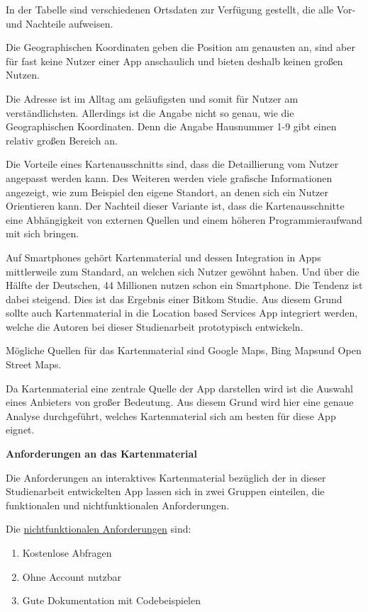 In der Tabelle sind verschiedenen Ortsdaten zur Verfügung gestellt, die alle Vor- und Nachteile aufweisen.

Die Geographischen Koordinaten geben die Position am genausten an, sind aber für fast keine Nutzer einer App anschaulich und bieten deshalb keinen großen Nutzen. 

Die Adresse ist im Alltag am geläufigsten und somit für Nutzer am verständlichsten. Allerdings ist die Angabe nicht so genau, wie die Geographischen Koordinaten. Denn die Angabe Hausnummer 1-9 gibt einen relativ großen Bereich an.

Die Vorteile eines Kartenausschnitts sind, dass die Detaillierung vom Nutzer angepasst werden kann. Des Weiteren werden viele grafische Informationen angezeigt, wie zum Beispiel den eigene Standort, an denen sich ein Nutzer Orientieren kann. Der Nachteil dieser Variante ist, dass die Kartenausschnitte eine Abhängigkeit von externen Quellen und einem höheren Programmieraufwand mit sich bringen.


Auf Smartphones gehört Kartenmaterial und dessen Integration in Apps mittlerweile zum Standard, an welchen sich Nutzer gewöhnt haben. Und über die Hälfte der Deutschen, 44 Millionen nutzen schon ein Smartphone. Die Tendenz ist dabei steigend. Dies ist das Ergebnis einer Bitkom Studie. \cite{bitkom} Aus diesem Grund sollte auch Kartenmaterial in die Location based Services App integriert werden, welche die Autoren bei dieser Studienarbeit prototypisch entwickeln. 

Mögliche Quellen für das Kartenmaterial sind \glqq Google Maps\grqq, \glqq Bing Maps\grqq  und \glqq Open Street Maps\grqq.

Da Kartenmaterial eine zentrale Quelle der App darstellen wird ist die Auswahl eines Anbieters von großer Bedeutung. Aus diesem Grund wird hier eine genaue Analyse durchgeführt, welches Kartenmaterial sich am besten für diese App eignet.

\textbf{Anforderungen an das Kartenmaterial}

Die Anforderungen an interaktives Kartenmaterial bezüglich der in dieser Studienarbeit entwickelten App lassen sich in zwei Gruppen einteilen, die funktionalen und nichtfunktionalen Anforderungen.

Die \underline{nichtfunktionalen Anforderungen} sind:
\begin{enumerate}
\item Kostenlose Abfragen
\item Ohne Account nutzbar
\item Gute Dokumentation mit Codebeispielen
\end{enumerate}

